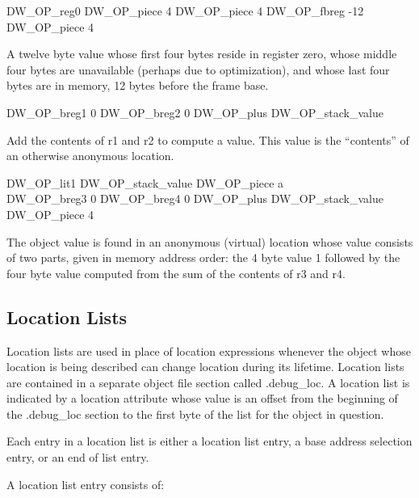 DW\-\_OP\-\_reg0 DW\-\_OP\-\_piece 4 DW\-\_OP\-\_piece 4 DW\-\_OP\-\_fbreg -12 DW\-\_OP\-\_piece 4
\begin{myindentpara}{1cm}
A twelve byte value whose first four bytes reside in register zero,
whose middle four bytes are unavailable (perhaps due to optimization),
and whose last four bytes are in memory, 12 bytes before the frame
base.
\end{myindentpara}

DW\-\_OP\-\_breg1 0 DW\-\_OP\-\_breg2 0 DW\-\_OP\-\_plus DW\-\_OP\-\_stack\-\_value
\begin{myindentpara}{1cm}
Add the contents of r1 and r2 to compute a value. This value is the
“contents” of an otherwise anonymous location.
\end{myindentpara}

DW\-\_OP\-\_lit1 DW\-\_OP\-\_stack\-\_value DW\-\_OP\-\_piece a \\
DW\-\_OP\-\_breg3 0 DW\-\_OP\-\_breg4 0 DW\-\_OP\-\_plus DW\-\_OP\-\_stack\-\_value DW\-\_OP\-\_piece 4
\begin{myindentpara}{1cm}
The object value is found in an anonymous (virtual) location whose
value consists of two parts, given in memory address order: the 4 byte
value 1 followed by the four byte value computed from the sum of the
contents of r3 and r4.
\end{myindentpara}


\subsection{Location Lists}
\label{chap:locationlists}
Location lists are used in place of location expressions
whenever the object whose location is being described
can change location during its lifetime. Location lists
are contained in a separate object file section called
.debug\_loc. A location list is indicated by a location
attribute whose value is an offset from the beginning of
the .debug\_loc section to the first byte of the list for the
object in question.

Each entry in a location list is either a location list entry,
a base address selection entry, or an end of list entry.

A location list entry consists of:

